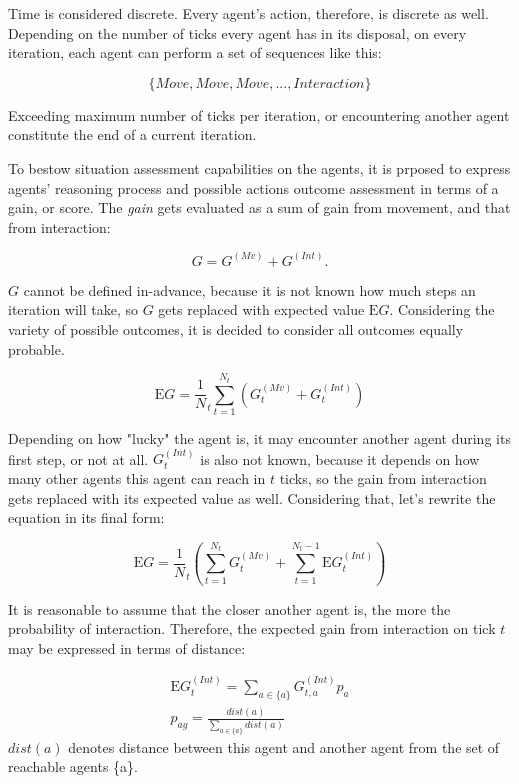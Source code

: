 Time is considered discrete. Every agent's action, therefore, is discrete as well. Depending on the number of ticks
every agent has in its disposal, on every iteration, each agent can perform a set of sequences like this:

$$
    \{Move, Move, Move, ..., Interaction\}
$$

Exceeding maximum number of ticks per iteration, or encountering another agent constitute the end of a current iteration.

To bestow situation assessment capabilities on the agents, it is prposed to express agents' reasoning process and
possible actions outcome assessment in terms of a gain, or score. The \textit{gain} gets evaluated as a sum of gain from
movement, and that from interaction:

$$
G = G^{(Mv)} + G^{(Int)}.
$$

$G$ cannot be defined in-advance, because it is not known how much steps an iteration will take, so $G$ gets replaced
with expected value $\mathrm{E}G$. Considering the variety of possible outcomes, it is decided to consider all outcomes
equally probable.

$$
    \mathrm{E}G = \frac 1 N_t \sum_{t=1}^{N_t}{(G^{(Mv)}_t + G^{(Int)}_t)}
$$

Depending on how "lucky" the agent is, it may encounter another agent during its first step, or not at all.
$G^{(Int)}_t$ is also not known, because it depends on how many other agents this agent can reach in $t$ ticks, so the
gain from interaction gets replaced with its expected value as well. Considering that, let's rewrite the equation in its
final form:

\begin{equation}
    \mathrm{E}{G} = \frac 1 N_t (\sum_{t=1}^{N_t}{G^{(Mv)}_t} + \sum_{t=1}^{N_t - 1}{\mathrm{E}G^{(Int)}_t})
\end{equation}

It is reasonable to assume that the closer another agent is, the more the probability of interaction. Therefore, the
expected gain from interaction on tick $t$ may be expressed in terms of distance:

\begin{equation}
    \begin{gathered}
        \mathrm{E}G^{(Int)}_t = \sum_{a \in \{a\}}{G^{(Int)}_{t,a}p_{a}}\\
        p_{ag} = \frac {dist(a)} {\sum_{a \in \{a\}}{dist(a)}}
    \end{gathered}
\end{equation}
$dist(a)$ denotes distance between this agent and another agent from the set of reachable agents \{a\}.

